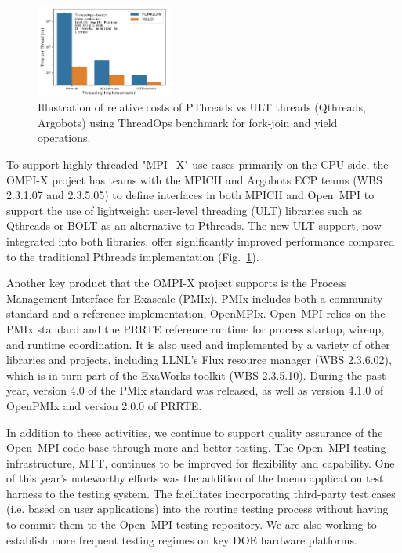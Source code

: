 \begin{figure}
    \includegraphics[width=0.40\textwidth]{projects/2.3.1-PMR/2.3.1.17-OMPI-X/ult-performance.png}
    \caption{Illustration of relative costs of PThreads vs ULT threads (Qthreads, Argobots) using ThreadOps benchmark for fork-join and yield operations.}
    \label{fig:ult-performance}
\end{figure}

To support highly-threaded "MPI+X" use cases primarily on the CPU side, the OMPI-X project has teams with the MPICH and Argobots ECP teams (WBS 2.3.1.07 and 2.3.5.05)
to define interfaces in both MPICH and Open~MPI to support the use of lightweight user-level threading (ULT) libraries such as Qthreads or BOLT
as an alternative to Pthreads.  The new ULT support, now integrated into both libraries, offer significantly improved performance compared to 
the traditional Pthreads implementation (Fig.~\ref{fig:ult-performance}).

Another key product that the OMPI-X project supports is the Process Management Interface for Exascale (PMIx).  PMIx includes both a community standard
and a reference implementation, OpenMPIx.  Open~MPI relies on the PMIx standard and the PRRTE reference runtime for process startup, wireup, and runtime coordination.
It is also used and implemented by a variety of other libraries and projects, including LLNL's Flux resource manager (WBS 2.3.6.02), which is in turn part of the ExaWorks toolkit (WBS 2.3.5.10).
During the past year, version 4.0 of the PMIx standard was released, as well as version 4.1.0 of OpenPMIx and version 2.0.0 of PRRTE.

In addition to these activities, we continue to support quality assurance of the Open~MPI code base through more and better testing.  The Open~MPI testing infrastructure, 
MTT, continues to be improved for flexibility and capability.  One of this year's noteworthy efforts was the addition of the bueno application test harness to the testing 
system.  The facilitates incorporating third-party test cases (i.e. based on user applications) into the routine testing process without having to commit them to the
Open~MPI testing repository.  We are also working to establish more frequent testing regimes on key DOE hardware platforms.

